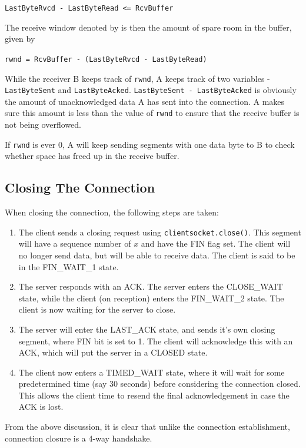 \documentclass[12pt,letterpaper]{book}
\theoremstyle{definition}
\begin{document}
\texttt{LastByteRvcd - LastByteRead <= RcvBuffer}

The receive window denoted by  is then the amount of spare room in the buffer, given by

\texttt{rwnd = RcvBuffer - (LastByteRvcd - LastByteRead)}

While the receiver B keeps track of \texttt{rwnd}, A keeps track of two variables - \texttt{LastByteSent} and \texttt{LastByteAcked}. \texttt{LastByteSent - LastByteAcked} is obviously the amount of unacknowledged data A has sent into the connection. A makes sure this amount is less than the value of \texttt{rwnd} to ensure that the receive buffer is not being overflowed.

If \texttt{rwnd} is ever 0, A will keep sending segments with one data byte to B to check whether space has freed up in the receive buffer.

\subsection{Closing The Connection}
When closing the connection, the following steps are taken:

\begin{enumerate}
  \item The client sends a closing request using \texttt{clientsocket.close()}. This segment will have a sequence number of $x$ and have the FIN flag set. The client will no longer send data, but will be able to receive data. The client is said to be in the FIN\_WAIT\_1 state.
  \item The server responds with an ACK. The server enters the CLOSE\_WAIT state, while the client (on reception) enters the FIN\_WAIT\_2 state. The client is now waiting for the server to close.
  \item The server will enter the LAST\_ACK state, and sends it's own closing segment, where FIN bit is set to 1. The client will acknowledge this with an ACK, which will put the server in a CLOSED state.
  \item The client now enters a TIMED\_WAIT state, where it will wait for some predetermined time (say 30 seconds) before considering the connection closed. This allows the client time to resend the final acknowledgement in case the ACK is lost.
\end{enumerate}

From the above discussion, it is clear that unlike the connection establishment, connection closure is a 4-way handshake.
\end{document}
